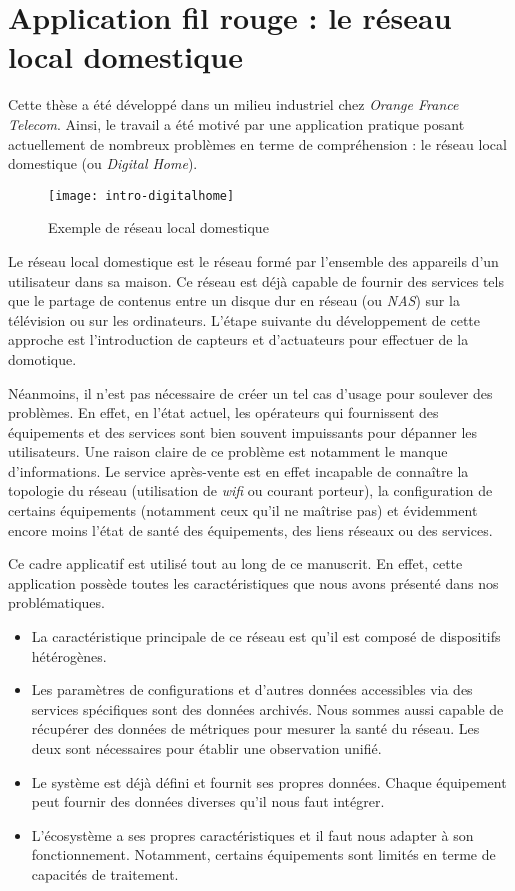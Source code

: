 \section{Application fil rouge : le réseau local domestique}\label{sec:introduction:digitalhome}
Cette thèse a été développé dans un milieu industriel chez \textit{Orange France Telecom}. Ainsi, le travail a été motivé par une application pratique posant actuellement de nombreux problèmes en terme de compréhension : le réseau local domestique (ou \textit{Digital Home}).

\begin{figure}[ht]
\centering
\texttt{[image: intro-digitalhome]}
\caption{Exemple de réseau local domestique}
\end{figure}

Le réseau local domestique est le réseau formé par l'ensemble des appareils d'un utilisateur dans sa maison. Ce réseau est déjà capable de fournir des services tels que le partage de contenus entre un disque dur en réseau (ou \textit{NAS}) sur la télévision ou sur les ordinateurs. L'étape suivante du développement de cette approche est l'introduction de capteurs et d'actuateurs pour effectuer de la domotique.

Néanmoins, il n'est pas nécessaire de créer un tel cas d'usage pour soulever des problèmes. En effet, en l'état actuel, les opérateurs qui fournissent des équipements et des services sont bien souvent impuissants pour dépanner les utilisateurs. Une raison claire de ce problème est notamment le manque d'informations. Le service après-vente est en effet incapable de connaître la topologie du réseau (utilisation de \textit{wifi} ou courant porteur), la configuration de certains équipements (notamment ceux qu'il ne maîtrise pas) et évidemment encore moins l'état de santé des équipements, des liens réseaux ou des services.

Ce cadre applicatif est utilisé tout au long de ce manuscrit. En effet, cette application possède toutes les caractéristiques que nous avons présenté dans nos problématiques.
\begin{itemize}
	\item La caractéristique principale de ce réseau est qu'il est composé de dispositifs hétérogènes.
	\item Les paramètres de configurations et d'autres données accessibles via des services spécifiques sont des données archivés. Nous sommes aussi capable de récupérer des données de métriques pour mesurer la santé du réseau. Les deux sont nécessaires pour établir une observation unifié.
	\item Le système est déjà défini et fournit ses propres données. Chaque équipement peut fournir des données diverses qu'il nous faut intégrer.
	\item L'écosystème a ses propres caractéristiques et il faut nous adapter à son fonctionnement. Notamment, certains équipements sont limités en terme de capacités de traitement.
\end{itemize}